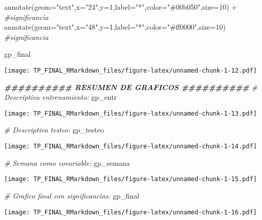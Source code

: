 \documentclass[
]{article}
\newenvironment{Shaded}{\begin{snugshade}}{\end{snugshade}}
\newcommand{\AttributeTok}[1]{\textcolor[rgb]{0.77,0.63,0.00}{#1}}
\newcommand{\CommentTok}[1]{\textcolor[rgb]{0.56,0.35,0.01}{\textit{#1}}}
\newcommand{\DecValTok}[1]{\textcolor[rgb]{0.00,0.00,0.81}{#1}}
\newcommand{\DocumentationTok}[1]{\textcolor[rgb]{0.56,0.35,0.01}{\textbf{\textit{#1}}}}
\newcommand{\FunctionTok}[1]{\textcolor[rgb]{0.00,0.00,0.00}{#1}}
\newcommand{\NormalTok}[1]{#1}
\newcommand{\SpecialCharTok}[1]{\textcolor[rgb]{0.00,0.00,0.00}{#1}}
\newcommand{\StringTok}[1]{\textcolor[rgb]{0.31,0.60,0.02}{#1}}
\begin{document}
\begin{Shaded}
\begin{Highlighting}[]
  \FunctionTok{annotate}\NormalTok{(}\AttributeTok{geom=}\StringTok{"text"}\NormalTok{,}\AttributeTok{x=}\StringTok{"24"}\NormalTok{,}\AttributeTok{y=}\DecValTok{1}\NormalTok{,}\AttributeTok{label=}\StringTok{"*"}\NormalTok{,}\AttributeTok{color=}\StringTok{"\#00b050"}\NormalTok{,}\AttributeTok{size=}\DecValTok{10}\NormalTok{) }\SpecialCharTok{+} \CommentTok{\#significancia}
  \FunctionTok{annotate}\NormalTok{(}\AttributeTok{geom=}\StringTok{"text"}\NormalTok{,}\AttributeTok{x=}\StringTok{"48"}\NormalTok{,}\AttributeTok{y=}\DecValTok{1}\NormalTok{,}\AttributeTok{label=}\StringTok{"*"}\NormalTok{,}\AttributeTok{color=}\StringTok{"\#ff0000"}\NormalTok{,}\AttributeTok{size=}\DecValTok{10}\NormalTok{)   }\CommentTok{\#significancia}
  
\NormalTok{gp\_final}
\end{Highlighting}
\end{Shaded}

\texttt{[image: TP\_FINAL\_RMarkdown\_files/figure-latex/unnamed-chunk-1-12.pdf]}

\begin{Shaded}
\begin{Highlighting}[]
\DocumentationTok{\#\#\#\#\#\#\#\#\#\# RESUMEN DE GRAFICOS \#\#\#\#\#\#\#\#\#\# }
\CommentTok{\# Descriptiva entrenamiento:}
\NormalTok{gp\_entr}
\end{Highlighting}
\end{Shaded}

\texttt{[image: TP\_FINAL\_RMarkdown\_files/figure-latex/unnamed-chunk-1-13.pdf]}

\begin{Shaded}
\begin{Highlighting}[]
\CommentTok{\# Descriptiva testeo:}
\NormalTok{gp\_testeo}
\end{Highlighting}
\end{Shaded}

\texttt{[image: TP\_FINAL\_RMarkdown\_files/figure-latex/unnamed-chunk-1-14.pdf]}

\begin{Shaded}
\begin{Highlighting}[]
\CommentTok{\# Semana como covariable:}
\NormalTok{gp\_semana}
\end{Highlighting}
\end{Shaded}

\texttt{[image: TP\_FINAL\_RMarkdown\_files/figure-latex/unnamed-chunk-1-15.pdf]}

\begin{Shaded}
\begin{Highlighting}[]
\CommentTok{\# Grafico final con significancias:}
\NormalTok{gp\_final}
\end{Highlighting}
\end{Shaded}

\texttt{[image: TP\_FINAL\_RMarkdown\_files/figure-latex/unnamed-chunk-1-16.pdf]}
\end{document}
